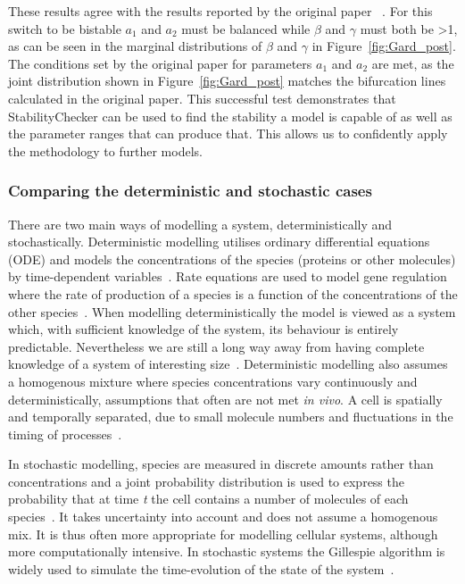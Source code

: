 These results agree with the results reported by the original paper~\autocite{Gardner:2000vha} . For this switch to be bistable $a_1$ and $a_2$ must be balanced while $\beta$ and $\gamma$ must both be \textgreater 1, as can be seen in the marginal distributions of $\beta$ and $\gamma$ in Figure~\ref{fig:Gard_post}. The conditions set by the original paper for parameters $a_1$ and $a_2$ are met, as the joint distribution shown in Figure~\ref{fig:Gard_post} matches the bifurcation lines calculated in the original paper. 
This successful test demonstrates that StabilityChecker can be used to find the stability a model is capable of as well as the parameter ranges that can produce that. This allows us to confidently apply the methodology to further models.
\newpage
\subsubsection{Comparing the deterministic and stochastic cases} 
    
There are two main ways of modelling a system, deterministically and stochastically. Deterministic modelling utilises ordinary differential equations (ODE) and models the concentrations of the species (proteins or other molecules) by time-dependent variables~\autocite{deJong:2002ft}. Rate equations are used to model gene regulation where the rate of production of a species is a function of the concentrations of the other species~\autocite{deJong:2002ft}. When modelling deterministically the model is viewed as a system which, with sufficient knowledge of the system, its behaviour is entirely predictable. Nevertheless we are still a long way away from having complete knowledge of a system of interesting size~\autocite{wilkinson:2006}. Deterministic modelling also assumes a homogenous mixture where species concentrations vary continuously and deterministically, assumptions that often are not met \textit{in vivo}. A cell is spatially and temporally separated, due to small molecule numbers and fluctuations in the timing of processes~\autocite{deJong:2002ft}.  
   
In stochastic modelling, species are measured in discrete amounts rather than concentrations and a joint probability distribution is used to express the probability that at time \textit{t} the cell contains a number of molecules of each species~\autocite{deJong:2002ft}. It takes uncertainty into account and does not assume a homogenous mix. It is thus often more appropriate for modelling cellular systems, although more computationally intensive. In stochastic systems the Gillespie algorithm is widely used to simulate the time-evolution of the state of the system~\autocite{Warren:2005kea}.


